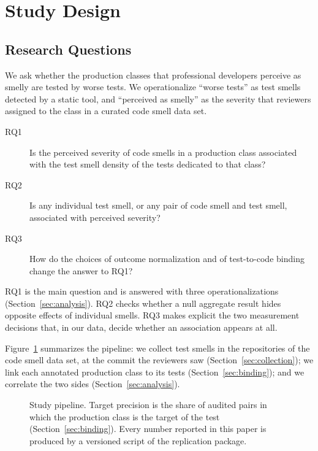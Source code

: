 
\section{Study Design}
\label{sec:design}

\subsection{Research Questions}
\label{sec:rqs}

We ask whether the production classes that professional developers perceive as smelly are
tested by worse tests. We operationalize ``worse tests'' as test smells detected by a
static tool, and ``perceived as smelly'' as the severity that reviewers assigned to the
class in a curated code smell data set.

\begin{description}
  \item[RQ1] Is the perceived severity of code smells in a production class associated
  with the test smell density of the tests dedicated to that class?
  \item[RQ2] Is any individual test smell, or any pair of code smell and test smell,
  associated with perceived severity?
  \item[RQ3] How do the choices of outcome normalization and of test-to-code binding
  change the answer to RQ1?
\end{description}

RQ1 is the main question and is answered with three operationalizations
(Section~\ref{sec:analysis}). RQ2 checks whether a null aggregate result hides opposite
effects of individual smells. RQ3 makes explicit the two measurement decisions that, in
our data, decide whether an association appears at all.

Figure~\ref{fig:pipeline} summarizes the pipeline: we collect test smells in the
repositories of the code smell data set, at the commit the reviewers saw
(Section~\ref{sec:collection}); we link each annotated production class to its tests
(Section~\ref{sec:binding}); and we correlate the two sides
(Section~\ref{sec:analysis}).

\begin{figure}[t]
  \centering
  
  \caption{Study pipeline. Target precision is the share of audited pairs in which the
  production class is the target of the test (Section~\ref{sec:binding}). Every number
  reported in this paper is produced by a versioned script of the replication package.}
  \label{fig:pipeline}
\end{figure}

